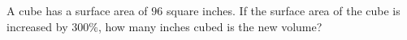 A cube has a surface area of $96$ square inches. If the surface area of the cube is increased by $300\%$, how many inches cubed is the new volume?
